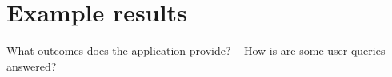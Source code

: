 \section{Example results}




What outcomes does the application provide? – How is are some user queries answered? 
